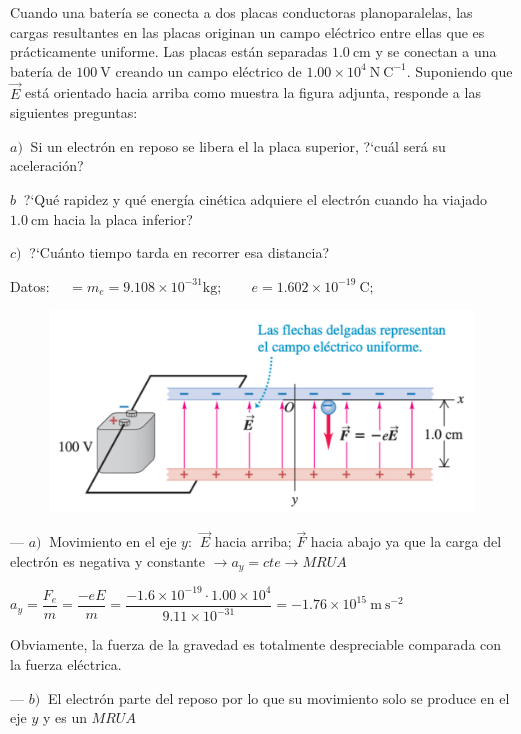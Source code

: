 \begin{prob}
Cuando una batería se conecta a dos placas conductoras planoparalelas, las cargas resultantes en las placas originan un campo eléctrico entre ellas que es prácticamente uniforme. Las placas están separadas $1.0\ \mathrm{cm}$ y se conectan a una batería de $100\ \mathrm{V}$ creando un campo eléctrico de $1.00\times 10^4\ \mathrm{N\ C}^{-1}$. Suponiendo que $\vec E$ está orientado hacia arriba como muestra la figura adjunta, responde a las siguientes preguntas:

$a)\ $ Si un electrón en reposo se libera el la placa superior, ?`cuál será su aceleración?

$b \ $ ?`Qué rapidez y qué energía cinética adquiere el electrón cuando ha viajado $1.0\ \mathrm{cm}$ hacia la placa inferior?

$c)\ $ ?`Cuánto tiempo tarda en recorrer esa distancia?

Datos: $\quad =m_e=9.108\times 10^{-31} \mathrm{kg};\qquad  e=1.602\times 10^{-19}\ \mathrm{C}; \qquad  $

\begin{figure}[H]
	\centering
	\includegraphics[width=.9\textwidth]{imagenes/imagenes22/T22IM19.png}
\end{figure}
\end{prob}

--- $a)\ $ Movimiento en el eje $y$: $\ \vec E$ hacia arriba; $\vec F$ hacia abajo ya que la carga del electrón es negativa y constante $\to a_y=cte \to MRUA$

$a_y=\dfrac{F_e}{m}=\dfrac{-eE}{m}=\dfrac{-1.6\times 10^{-19} \cdot 1.00\times 10^{4}}{9.11\times 10^{-31}}=-1.76\times 10^{15}\ \mathrm{m\ s}^{-2}$

Obviamente, la fuerza de la gravedad es totalmente despreciable comparada con la fuerza eléctrica.

--- $b)\ $ El electrón parte del reposo por lo que su movimiento solo se produce en el eje $y$ y es un $MRUA$

